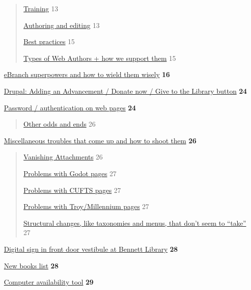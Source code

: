 \documentclass[
  openany]{book}
\begin{document}
\begin{quote}
\protect\hyperlink{training}{Training} 13

\protect\hyperlink{authoring-and-editing}{Authoring and editing} 13

\protect\hyperlink{best-practices}{Best practices} 15

\protect\hyperlink{types-of-web-authors-how-we-support-them}{Types of Web Authors + how we support
them} 15
\end{quote}

\protect\hyperlink{ebranch-superpowers-and-how-to-wield-them-wisely}{eBranch superpowers and how to wield them
wisely} \textbf{16}

\protect\hyperlink{drupal-adding-an-advancement-donate-now-give-to-the-library-button}{Drupal: Adding an Advancement / Donate now / Give to the Library
button}
\textbf{24}

\protect\hyperlink{password-authentication-on-web-pages}{Password / authentication on web
pages} \textbf{24}

\begin{quote}
\protect\hyperlink{other-odds-and-ends}{Other odds and ends} 26
\end{quote}

\protect\hyperlink{miscellaneous-troubles-that-come-up-and-how-to-shoot-them}{Miscellaneous troubles that come up and how to shoot
them} \textbf{26}

\begin{quote}
\protect\hyperlink{vanishing-attachments}{Vanishing Attachments} 26

\protect\hyperlink{problems-with-godot-pages}{Problems with Godot pages} 27

\protect\hyperlink{problems-with-cufts-pages}{Problems with CUFTS pages} 27

\protect\hyperlink{problems-with-troymillennium-pages}{Problems with Troy/Millennium
pages} 27

\protect\hyperlink{structural-changes-like-taxonomies-and-menus-that-dont-seem-to-take}{Structural changes, like taxonomies and menus, that don't seem to
``take''}
27
\end{quote}

\protect\hyperlink{digital-sign-in-front-door-vestibule-at-bennett-library}{Digital sign in front door vestibule at Bennett
Library}
\textbf{28}

\protect\hyperlink{new-books-list}{New books list} \textbf{28}

\protect\hyperlink{computer-availability-tool}{Computer availability tool} \textbf{29}
\end{document}

